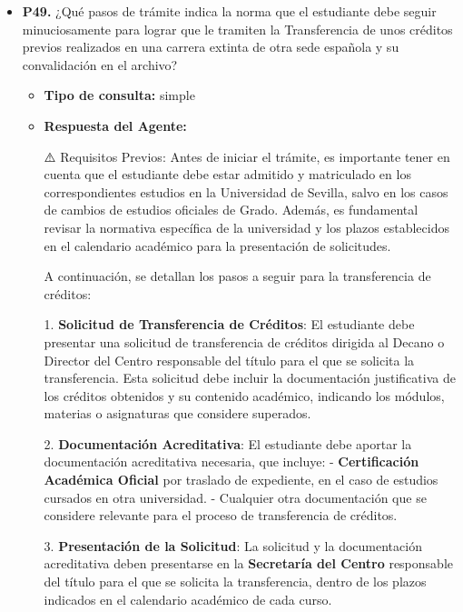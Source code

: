 \documentclass{article}
\begin{document}
\begin{itemize}
\begin{itemize}
\begin{scriptsize}
                  VERSIÓN 2 OCTUBRE 2024    PÁGINA 9 | 21
                \end{scriptsize}
        \end{itemize}


  \item \textbf{P49.} ¿Qué pasos de trámite indica la norma que el estudiante debe seguir minuciosamente para lograr que le tramiten la Transferencia de unos créditos previos realizados en una carrera extinta de otra sede española y su convalidación en el archivo? \\
        \begin{itemize}
          \item \textbf{Tipo de consulta:} simple
          \item \textbf{Respuesta del Agente:}

                ⚠️ Requisitos Previos:
                Antes de iniciar el trámite, es importante tener en cuenta que el estudiante debe estar admitido y matriculado en los correspondientes estudios en la Universidad de Sevilla, salvo en los casos de cambios de estudios oficiales de Grado. Además, es fundamental revisar la normativa específica de la universidad y los plazos establecidos en el calendario académico para la presentación de solicitudes.

                A continuación, se detallan los pasos a seguir para la transferencia de créditos:

                1. \textbf{Solicitud de Transferencia de Créditos}: El estudiante debe presentar una solicitud de transferencia de créditos dirigida al Decano o Director del Centro responsable del título para el que se solicita la transferencia. Esta solicitud debe incluir la documentación justificativa de los créditos obtenidos y su contenido académico, indicando los módulos, materias o asignaturas que considere superados.

                2. \textbf{Documentación Acreditativa}: El estudiante debe aportar la documentación acreditativa necesaria, que incluye:
                - \textbf{Certificación Académica Oficial} por traslado de expediente, en el caso de estudios cursados en otra universidad.
                - Cualquier otra documentación que se considere relevante para el proceso de transferencia de créditos.

                3. \textbf{Presentación de la Solicitud}: La solicitud y la documentación acreditativa deben presentarse en la \textbf{Secretaría del Centro} responsable del título para el que se solicita la transferencia, dentro de los plazos indicados en el calendario académico de cada curso.


\end{itemize}
\end{itemize}
\end{document}
